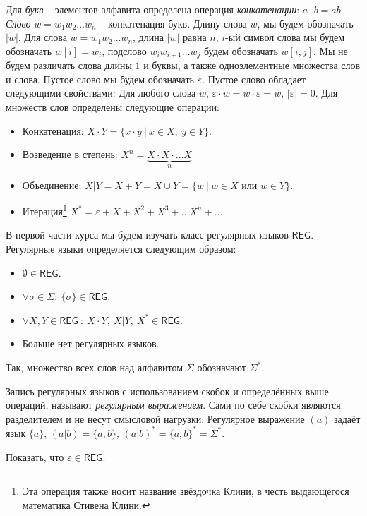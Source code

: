 \documentclass[12pt]{article}
\theoremstyle{definiton}
\theoremstyle{definition}
\theoremstyle{definition}
\let\eps\varepsilon
\def\REG{{\mathsf{REG}}}
\newcounter{problem}
\newcounter{uproblem}
\newcounter{subproblem}
\def\upr{\medskip\noindent\stepcounter{uproblem}{\bf Упражнение \theuproblem .  }\setcounter{subproblem}{0} }
\begin{document}
	Для \emph{букв} -- элементов алфавита определена операция \emph{конкатенации}: $a\cdot b = ab$.
	\emph{Слово} $w = w_1w_2\ldots w_n$ -- конкатенация букв. Длину слова $w$, мы будем обозначать $|w|$.
	Для слова $w = w_1w_2\ldots w_n$, длина $|w|$ равна $n$, $i$-ый символ слова мы будем обозначать $w[i] = w_i$,
	подслово $w_iw_{i+1}\ldots w_j$ будем обозначать $w[i,j]$. Мы не будем различать слова длины $1$ и буквы, а также
	одноэлементные множества слов и слова. Пустое слово мы будем обозначать $\eps$. Пустое слово обладает следующими свойствами:
	Для любого слова $w$, $\eps\cdot w = w \cdot \eps = w$, $|\eps| = 0$.   
	Для множеств слов определены следующие операции:

	\begin{itemize}
		\item Конкатенация: $X\cdot Y = \{ x\cdot y\ |\ x \in X,\ y \in Y  \}$.
		\item Возведение в степень: $X^n = \underbrace{X\cdot X\cdot\ldots X}_{n}$
		\item Объединение: $X | Y = X + Y = X \cup Y = \{ w\ |\ w \in X $ или $ w \in Y\} $.
		\item Итерация\footnote{Эта операция также носит название звёздочка Клини, в честь выдающегося математика Стивена Клини.} $X^* = \eps + X + X^2 + X^3 + \ldots X^n + \ldots$
	\end{itemize}

	В первой части курса мы будем изучать класс регулярных языков $\REG$. Регулярные языки определяется следующим образом:

	\begin{itemize}
		\item $\emptyset \in \REG$.
		\item $\forall \sigma \in \Sigma:\ \{ \sigma \} \in \REG $.
		\item $\forall X, Y \in \REG\ :\ X\cdot Y,\ X|Y,\ X^* \in \REG   $.
		\item Больше нет регулярных языков.
	\end{itemize}

	Так, множество всех слов над алфавитом $\Sigma$ обозначают $\Sigma^*$.


	Запись регулярных языков с использованием скобок и определённых выше операций, называют \emph{регулярным выражением}.
	Сами по себе скобки являются разделителем и не несут смысловой нагрузки: 
	Регулярное выражение $(a) $  задаёт язык $\{a\}$, $(a|b) = \{a,b\}$, $(a|b)^* = \{a,b\}^* = \Sigma^*$.
	
	\upr Показать, что $\eps \in \REG$.
	\medskip
	
\end{document}
